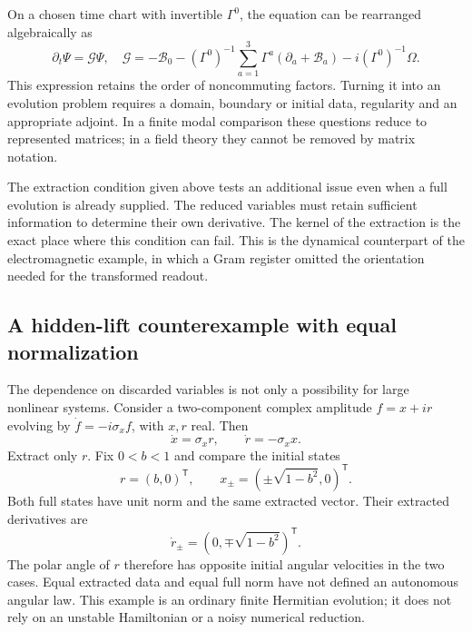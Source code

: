\documentclass[11pt,a4paper]{article}
\begin{document}
On a chosen time chart with invertible $\Gamma^0$, the equation can
be rearranged algebraically as
\begin{equation}
 \partial_t\Psi=\mathcal G\Psi,
 \quad \mathcal G=-\mathcal B_0-(\Gamma^0)^{-1}
 \sum_{a=1}^3\Gamma^a(\partial_a+\mathcal B_a)
              -i(\Gamma^0)^{-1}\Omega.
\end{equation}
This expression retains the order of noncommuting factors. Turning it
into an evolution problem requires a domain, boundary or initial data,
regularity and an appropriate adjoint. In a finite modal comparison
these questions reduce to represented matrices; in a field theory they
cannot be removed by matrix notation.

The extraction condition given above tests an additional issue even
when a full evolution is already supplied. The reduced variables must
retain sufficient information to determine their own derivative.
The kernel of the extraction is the exact place where this condition
can fail. This is the dynamical counterpart of the electromagnetic
example, in which a Gram register omitted the orientation needed for
the transformed readout.

\subsection{A hidden-lift counterexample with equal normalization}
The dependence on discarded variables is not only a possibility for
large nonlinear systems. Consider a two-component complex amplitude
$f=x+ir$ evolving by $\dot f=-i\sigma_x f$, with $x,r$ real.
Then
\begin{equation}
 \dot x=\sigma_xr,\qquad\dot r=-\sigma_xx.
\end{equation}
Extract only $r$. Fix $0<b<1$ and compare the initial states
\begin{equation}
 r=(b,0)^{\mathsf T},\qquad
 x_\pm=(\pm\sqrt{1-b^2},0)^{\mathsf T}.
\end{equation}
Both full states have unit norm and the same extracted vector. Their
extracted derivatives are
\begin{equation}
 \dot r_\pm=(0,\mp\sqrt{1-b^2})^{\mathsf T}.
\end{equation}
The polar angle of $r$ therefore has opposite initial angular
velocities in the two cases. Equal extracted data and equal full
norm have not defined an autonomous angular law. This example is an
ordinary finite Hermitian evolution; it does not rely on an unstable
Hamiltonian or a noisy numerical reduction.
\end{document}
